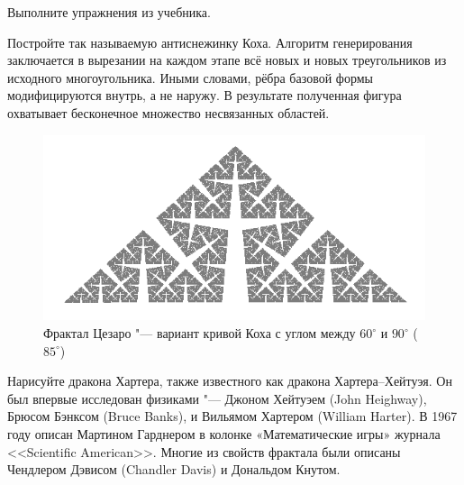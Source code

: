 \ExercisesSection
\begin{exercise}
\item Выполните упражнения из  учебника.

\item Постройте так называемую антиснежинку Коха. Алгоритм генерирования заключается в вырезании на каждом этапе всё новых и новых треугольников из исходного многоугольника. Иными словами, рёбра базовой формы модифицируются внутрь, а не наружу. В результате полученная фигура охватывает бесконечное множество несвязанных областей.

\begin{figure}[ht]
  {\centering
    \includegraphics[height=0.2\textwidth]{images/koch_curve_85_degrees.png}

  }
  \caption{Фрактал Цезаро "--- вариант кривой Коха с углом между \(60^{\circ}\) и \(90^{\circ}\) (\(85^{\circ}\))}
\end{figure}

\item Нарисуйте дракона Хартера, также известного как дракона Хартера--Хейтуэя. Он был впервые исследован физиками  "--- Джоном Хейтуэем (John Heighway), Брюсом Бэнксом (Bruce Banks), и Вильямом Хартером (William Harter). В 1967 году описан Мартином Гарднером в колонке «Математические игры» журнала <<\textenglish{Scientific American}>>. Многие из свойств фрактала были описаны Чендлером Дэвисом (Chandler Davis) и Дональдом Кнутом.


\end{exercise}
